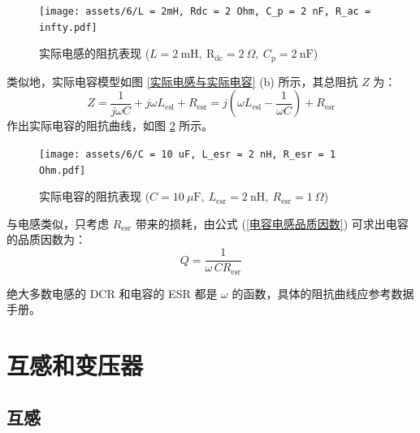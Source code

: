 \documentclass[UTF8]{report}
\def\nF{\ \mathrm{nF}}
\theoremstyle{MyLineTheoremStyle} %
\theoremstyle{MyBlockTheoremStyle} %
\theoremstyle{MySubsubsectionStyle} %
\begin{document}
\begin{figure}[H]\centering
    \texttt{[image: assets/6/L = 2mH, Rdc = 2 Ohm, C\_p = 2 nF, R\_ac = infty.pdf]}
    \caption{实际电感的阻抗表现 ($L = 2\ \mathrm{mH},\ \mathrm{R_{\text{dc}}} = 2 \ \Omega,\ C_\text{p} = 2 \nF$)}
    \label{实际电感的阻抗表现}
\end{figure}


类似地，实际电容模型如图 \ref{实际电感与实际电容} (b) 所示，其总阻抗 $Z$ 为：
\begin{equation}
Z = \frac{1}{j \omega C} + j \omega L_{\text{esl}} + R_{\text{esr}} = j \left( \omega L_\text{esl} - \frac{1}{\omega C} \right) +  R_{\text{esr}}
\end{equation}
作出实际电容的阻抗曲线，如图 \ref{实际电容的阻抗表现} 所示。




\begin{figure}[H]\centering
    \texttt{[image: assets/6/C = 10 uF, L\_esr = 2 nH, R\_esr = 1 Ohm.pdf]}
    \caption{实际电容的阻抗表现 ($C = 10 \ \mu \mathrm{F},\ L_{\text{esr}} = 2 \ \mathrm{nH},\ R_{\text{esr}} = 1 \ \Omega$)}
    \label{实际电容的阻抗表现}
\end{figure}

与电感类似，只考虑 $R_{\text{esr}}$ 带来的损耗，由公式 (\ref{电容电感品质因数}) 可求出电容的品质因数为：
\begin{equation}
Q = \frac{1}{\omega \,C R_{\text{esr}}}
\end{equation}

绝大多数电感的 DCR 和电容的 ESR 都是 $\omega$ 的函数，具体的阻抗曲线应参考数据手册。


\section{互感和变压器}

\subsection{互感}
\end{document}
